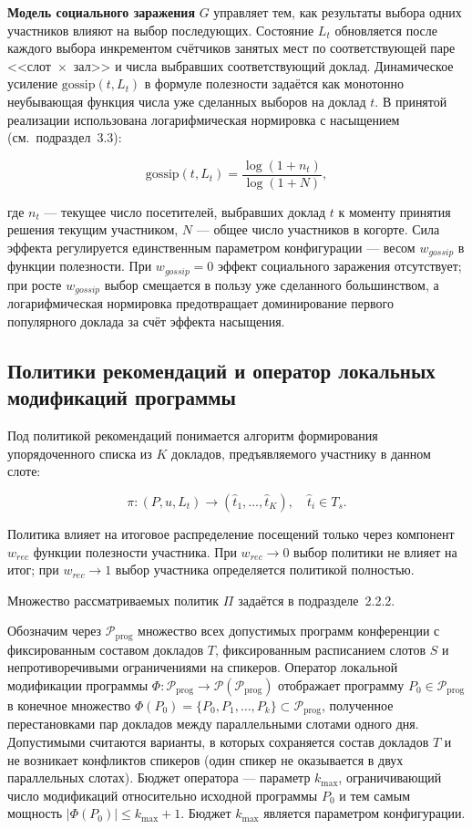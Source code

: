 \textbf{Модель социального заражения} $G$ управляет тем, как результаты выбора одних участников влияют на выбор последующих. Состояние $L_t$ обновляется после каждого выбора инкрементом счётчиков занятых мест по соответствующей паре <<слот~$\times$~зал>> и числа выбравших соответствующий доклад. Динамическое усиление $\mathrm{gossip}(t, L_t)$ в формуле полезности задаётся как монотонно неубывающая функция числа уже сделанных выборов на доклад $t$. В принятой реализации использована логарифмическая нормировка с насыщением (см.~подраздел~3.3):

\[
\mathrm{gossip}(t, L_t) = \frac{\log(1 + n_t)}{\log(1 + N)},
\]

\noindent где $n_t$ --- текущее число посетителей, выбравших доклад $t$ к моменту принятия решения текущим участником, $N$ --- общее число участников в когорте. Сила эффекта регулируется единственным параметром конфигурации --- весом $w_{gossip}$ в функции полезности. При $w_{gossip} = 0$ эффект социального заражения отсутствует; при росте $w_{gossip}$ выбор смещается в пользу уже сделанного большинством, а логарифмическая нормировка предотвращает доминирование первого популярного доклада за счёт эффекта насыщения.


\subsection{Политики рекомендаций и оператор локальных модификаций программы}

Под политикой рекомендаций понимается алгоритм формирования упорядоченного списка из $K$ докладов, предъявляемого участнику в данном слоте:

\[
\pi: (P, u, L_t) \to (\hat t_1, \dots, \hat t_K), \quad \hat t_i \in T_s.
\]

Политика влияет на итоговое распределение посещений только через компонент $w_{rec}$ функции полезности участника. При $w_{rec} \to 0$ выбор политики не влияет на итог; при $w_{rec} \to 1$ выбор участника определяется политикой полностью.

Множество рассматриваемых политик $\Pi$ задаётся в подразделе~2.2.2.

Обозначим через $\mathcal{P}_{\text{prog}}$ множество всех допустимых программ конференции с фиксированным составом докладов $T$, фиксированным расписанием слотов $S$ и непротиворечивыми ограничениями на спикеров. Оператор локальной модификации программы $\Phi: \mathcal{P}_{\text{prog}} \to \mathcal{P}(\mathcal{P}_{\text{prog}})$ отображает программу $P_0 \in \mathcal{P}_{\text{prog}}$ в конечное множество $\Phi(P_0) = \{P_0, P_1, \dots, P_k\} \subset \mathcal{P}_{\text{prog}}$, полученное перестановками пар докладов между параллельными слотами одного дня. Допустимыми считаются варианты, в которых сохраняется состав докладов $T$ и не возникает конфликтов спикеров (один спикер не оказывается в двух параллельных слотах). Бюджет оператора --- параметр $k_{\max}$, ограничивающий число модификаций относительно исходной программы $P_0$ и тем самым мощность $|\Phi(P_0)| \leq k_{\max} + 1$. Бюджет $k_{\max}$ является параметром конфигурации.


